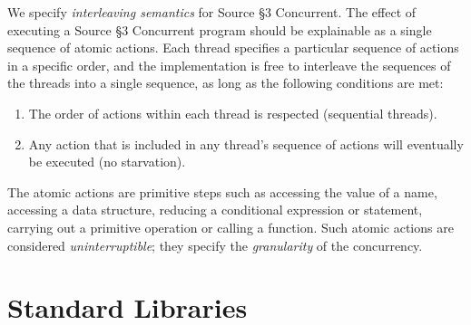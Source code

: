 We specify \emph{interleaving semantics} for Source \S 3 Concurrent.
The effect of executing a Source \S 3 Concurrent program
should be explainable as a single sequence of atomic actions. Each thread
specifies a particular sequence of actions in a specific order,
and the implementation is free to interleave the sequences of the threads
into a single sequence, as long as the following conditions are met:
\begin{enumerate}
\item The order of actions within each thread is respected (sequential
  threads).
\item Any action that is included in any thread's sequence of actions will
  eventually be executed (no starvation).
\end{enumerate}
\noindent
The atomic actions are primitive steps such as accessing the value of a name,
accessing a data structure, reducing a conditional expression or statement,
carrying out a primitive operation or calling a function. Such atomic actions
are considered \emph{uninterruptible}; they specify the \emph{granularity}
of the concurrency.



\newpage



\newpage



















\section{Standard Libraries}















\newpage



\newpage



    

